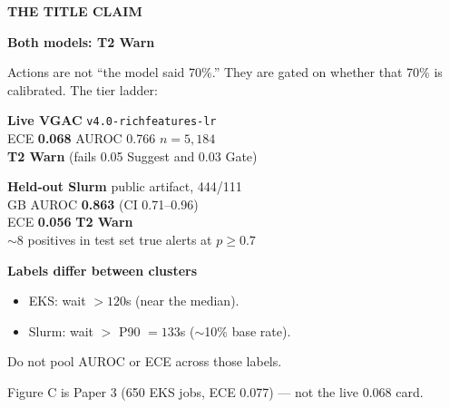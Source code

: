 \documentclass[12pt]{article}
\newlength{\colw}
\newcommand{\kicker}[1]{%
  {\fontsize{18}{22}\selectfont\bfseries\color{pytorch}\MakeUppercase{#1}\par}\vspace{0.08in}}
\newcommand{\sectionhead}[1]{%
  {\fontsize{36}{42}\selectfont\bfseries\color{navy}#1\par}\vspace{0.16in}}
\newcommand{\body}{\fontsize{26}{33}\selectfont\color{ink}}
\newcommand{\captiontext}{\fontsize{20}{26}\selectfont\color{muted}}
\begin{document}
\begin{minipage}[t]{\colw}
\kicker{The title claim}
\sectionhead{Both models: T2 Warn}

{\body
Actions are not ``the model said 70\%.'' They are gated on whether that
70\% is calibrated. The tier ladder:
}

\vspace{0.22in}

\vspace{0.28in}
{\body
{\bfseries\color{navy}Live VGAC} \hfill \texttt{v4.0-richfeatures-lr}\\[0.06in]
ECE \textbf{0.068} \quad AUROC 0.766 \quad $n=5{,}184$\\
\textcolor{pytorch}{\bfseries T2 Warn} (fails 0.05 Suggest and 0.03 Gate)

\vspace{0.20in}
{\bfseries\color{navy}Held-out Slurm} \hfill public artifact, 444/111\\[0.06in]
GB AUROC \textbf{0.863} (CI 0.71--0.96)\\
ECE \textbf{0.056} \quad \textcolor{pytorch}{\bfseries T2 Warn}\\
$\sim$8 positives in test set  true alerts at $p\ge 0.7$

\vspace{0.20in}
{\bfseries\color{navy}Labels differ between clusters}
\begin{itemize}
  \item EKS: wait $>120$s (near the median).
  \item Slurm: wait $>$ P90 $= 133$s ($\sim$10\% base rate).
\end{itemize}
Do not pool AUROC or ECE across those labels.
}

\vspace{0.12in}
{\captiontext
Figure C is Paper 3 (650 EKS jobs, ECE 0.077) --- not the live 0.068 card.}
\end{minipage}
\end{document}
